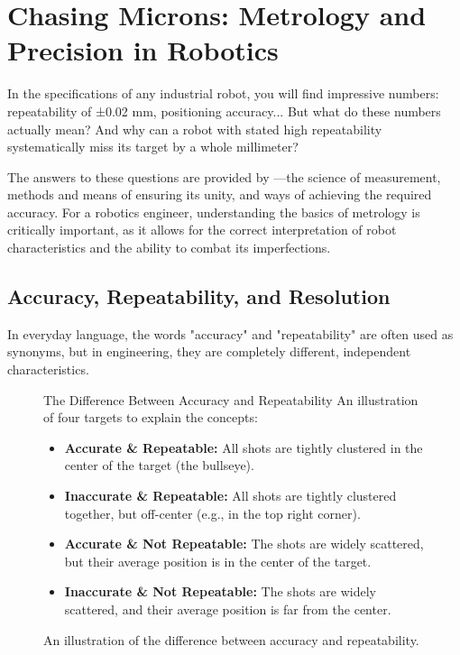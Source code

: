 \section{Chasing Microns: Metrology and Precision in Robotics}
\label{sec:metrology}

In the specifications of any industrial robot, you will find impressive numbers: repeatability of ±0.02 mm, positioning accuracy... But what do these numbers actually mean? And why can a robot with stated high repeatability systematically miss its target by a whole millimeter?

The answers to these questions are provided by —the science of measurement, methods and means of ensuring its unity, and ways of achieving the required accuracy. For a robotics engineer, understanding the basics of metrology is critically important, as it allows for the correct interpretation of robot characteristics and the ability to combat its imperfections.

\subsection{Accuracy, Repeatability, and Resolution}
\label{sec:accuracy_repeatability}

In everyday language, the words "accuracy" and "repeatability" are often used as synonyms, but in engineering, they are completely different, independent characteristics.

\begin{figure}[h!]
    \centering
    \begin{infobox}{The Difference Between Accuracy and Repeatability}
        An illustration of four targets to explain the concepts:
        \begin{itemize}
            \item \textbf{Accurate \& Repeatable:} All shots are tightly clustered in the center of the target (the bullseye).
            \item \textbf{Inaccurate \& Repeatable:} All shots are tightly clustered together, but off-center (e.g., in the top right corner).
            \item \textbf{Accurate \& Not Repeatable:} The shots are widely scattered, but their average position is in the center of the target.
            \item \textbf{Inaccurate \& Not Repeatable:} The shots are widely scattered, and their average position is far from the center.
        \end{itemize}
    \end{infobox}
    \caption{An illustration of the difference between accuracy and repeatability.}
    \label{fig:accuracy_vs_repeatability}
\end{figure}

